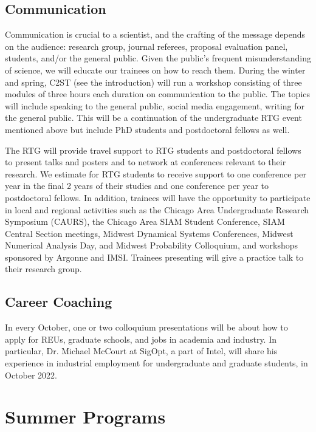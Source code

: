 \documentclass[11pt]{NSFamsart}
\begin{document}
\subsection*{Communication}
Communication is crucial to a scientist, and the crafting of the message depends on the audience:  research group, journal referees, proposal evaluation panel, students, and/or the general public.  Given the public's frequent misunderstanding of science, we will educate our trainees on how to reach them.  During the winter and spring, C2ST (see the introduction) will run a workshop consisting of three modules of three hours each duration on communication to the public.  The topics will include speaking to the general public, social media engagement, writing for the general public.  This will be a continuation of the undergraduate RTG event mentioned above but include PhD students and postdoctoral fellows as well.

The RTG will provide travel support to RTG students and postdoctoral fellows to   present talks and posters and to network at conferences relevant to their research. We estimate for RTG students to receive support to one conference per year in the final 2 years of their studies and one conference per year to postdoctoral fellows.  In addition, trainees will have the opportunity to participate in local and regional activities such as the Chicago Area Undergraduate Research Symposium (CAURS), the Chicago Area SIAM Student Conference, SIAM Central Section meetings, Midwest Dynamical Systems Conferences, Midwest Numerical Analysis Day, and Midwest Probability Colloquium, and workshops sponsored by Argonne and IMSI. Trainees presenting will give a practice talk to their research group.

\subsection*{Career Coaching}
In every October, one or two colloquium presentations will be about how to apply for REUs, graduate schools, and   jobs   in academia and industry. 
In particular, Dr. Michael McCourt at SigOpt, a part of Intel, will share  his experience in industrial employment for undergraduate and graduate students, in October 2022. 




\section{Summer Programs}
 
\end{document}

